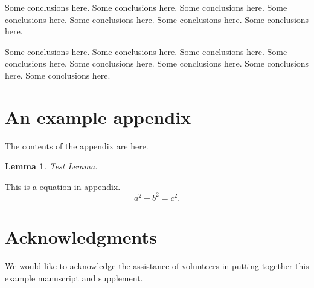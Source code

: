 \documentclass[10pt,reqno,final]{article}
\theoremstyle{plain}
\newtheorem{lemma}{Lemma}[section]
\theoremstyle{definition}
\theoremstyle{remark}
\numberwithin{equation}{section}
\numberwithin{figure}{section}
\numberwithin{table}{section}
\begin{document}
Some conclusions here. Some conclusions here. Some conclusions here.
Some conclusions here. Some conclusions here. Some conclusions here.
Some conclusions here.

Some conclusions here. Some conclusions here. Some conclusions here.
Some conclusions here. Some conclusions here. Some conclusions here.
Some conclusions here. Some conclusions here.

\appendix
\section{An example appendix}

The contents of the appendix are here.

\begin{lemma}
Test Lemma.
\end{lemma}

This is a equation in appendix.
\begin{equation}\label{eq:A1}
  a^2+b^2=c^2.
\end{equation}

\section*{Acknowledgments}
We would like to acknowledge the assistance of volunteers in putting
together this example manuscript and supplement.



%


\end{document}
